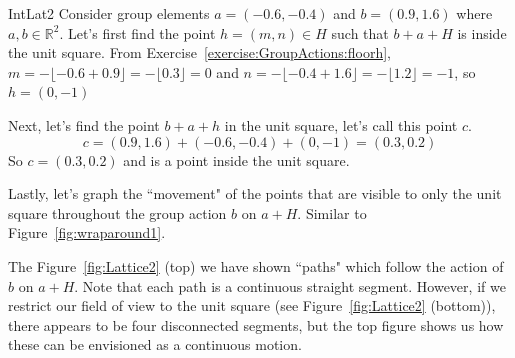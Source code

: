 \begin{example}{IntLat2} Consider group elements $a=(-0.6,-0.4)$ and $b=(0.9,1.6)$ where $a,b \in \mathbb{R}^2$.
Let's first find the point $h=(m,n) \in H$ such that $b+a+H$ is inside the unit square. From Exercise~\ref{exercise:GroupActions:floorh}, $m=-\lfloor -0.6+0.9 \rfloor=-\lfloor 0.3 \rfloor=0$ and $n=-\lfloor -0.4+1.6 \rfloor=-\lfloor 1.2 \rfloor=-1$, so $h=(0,-1)$

Next, let's find the point $b+a+h$ in the unit square, let's call this point $c$. $$c=(0.9,1.6)+(-0.6,-0.4)+(0,-1)=(0.3,0.2)$$ So $c=(0.3,0.2)$ and is a point inside the unit square.

Lastly, let's graph the ``movement" of the points that are visible to only the unit square throughout the group action $b$ on $a+H$. Similar to Figure~\ref{fig:wraparound1}.

The Figure~\ref{fig:Lattice2} (top) we have shown ``paths" which follow the action of $b$ on $a+H$. Note that each path is a continuous straight segment. However, if we restrict our field of view to the unit square (see Figure~\ref{fig:Lattice2} (bottom)), there appears to be four disconnected segments, but the top figure shows us how these can be envisioned as a continuous motion.


\end{example}
